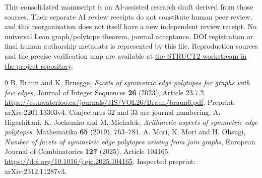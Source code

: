 \documentclass[11pt]{article}
\theoremstyle{remark}
\begin{document}
This consolidated manuscript is an AI-assisted research draft derived
from those sources. Their separate AI review receipts do not constitute
human peer review, and this reorganization does not itself have a new
independent review receipt. No universal Lean graph/polytope theorem,
journal acceptance, DOI registration or final human authorship metadata
is represented by this file. Reproduction sources and the precise
verification map are available at
\href{https://github.com/mio-qwq/math/tree/partner/dist-STRUCT2-20261012/workstreams/STRUCT2-20261012}{the STRUCT2 workstream in the project repository}.

\begin{thebibliography}{9}
 B. Braun and K. Bruegge,
\emph{Facets of symmetric edge polytopes for graphs with few edges},
Journal of Integer Sequences \textbf{26} (2023), Article 23.7.2.
\url{https://cs.uwaterloo.ca/journals/JIS/VOL26/Braun/braun6.pdf}.
Preprint: arXiv:2201.13303v4. Conjectures 32 and 33 are journal numbering.
 A. Higashitani, K. Jochemko and M. Micha\l ek,
\emph{Arithmetic aspects of symmetric edge polytopes},
Mathematika \textbf{65} (2019), 763--784.
 A. Mori, K. Mori and H. Ohsugi,
\emph{Number of facets of symmetric edge polytopes arising from join graphs},
European Journal of Combinatorics \textbf{127} (2025), Article 104165.
\url{https://doi.org/10.1016/j.ejc.2025.104165}.
Inspected preprint: arXiv:2312.11287v3.
\end{thebibliography}
\end{document}
